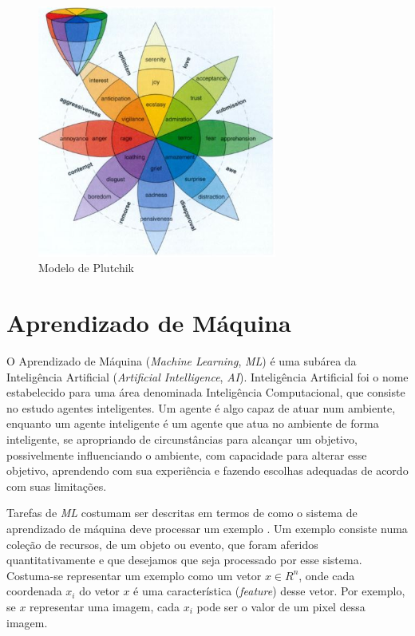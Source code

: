\begin{figure}[!h]
\centering
\includegraphics[width=0.7\textwidth]{imagens/plutchik.JPG}
\caption{\label{fig:plutchik}Modelo de Plutchik \cite{57}}
\end{figure}

\section{Aprendizado de Máquina}

O Aprendizado de Máquina (\textit{Machine Learning}, \textit{ML}) é uma subárea da Inteligência Artificial (\textit{Artificial Intelligence}, \textit{AI}). Inteligência Artificial foi o nome estabelecido \cite{12.23} para uma área denominada Inteligência Computacional, que consiste no estudo agentes inteligentes. Um agente é algo capaz de atuar num ambiente, enquanto um agente inteligente é um agente que atua no ambiente de forma inteligente, se apropriando de circunstâncias para alcançar um objetivo, possivelmente influenciando o ambiente, com capacidade para alterar esse objetivo, aprendendo com sua experiência e fazendo escolhas adequadas de acordo com suas limitações.

Tarefas de \textit{ML} costumam ser descritas em termos de como o sistema de aprendizado de máquina deve processar um exemplo \cite{53}. Um exemplo consiste numa coleção de recursos, de um objeto ou evento, que foram aferidos quantitativamente e que desejamos que seja processado por esse sistema. Costuma-se representar um exemplo como um vetor $x \in R^n$, onde cada coordenada $x_i$ do vetor $x$ é uma característica (\textit{feature}) desse vetor. Por exemplo, se $x$ representar uma imagem, cada $x_i$ pode ser o valor de um pixel dessa imagem.

